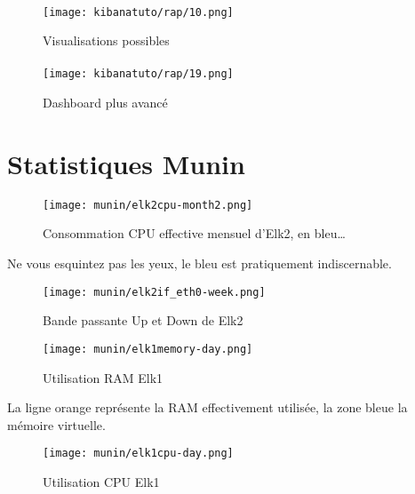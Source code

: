 \paragraph{}
\begin{figure}[H]
\center
\texttt{[image: kibanatuto/rap/10.png]}
\label{fig:kibanatuto7}
\caption{Visualisations possibles}
\end{figure}
\paragraph{}
\begin{figure}[H]
\center
\texttt{[image: kibanatuto/rap/19.png]}
\label{fig:kibanatuto12}
\caption{Dashboard plus avancé}
\end{figure}

\section{Statistiques Munin}
\begin{figure}[H]
\center
\texttt{[image: munin/elk2cpu-month2.png]}
\label{fig:elk2cpu}
\caption{Consommation CPU effective mensuel d'Elk2, en bleu\ldots}
\end{figure}
Ne vous esquintez pas les yeux, le bleu est pratiquement indiscernable.

\begin{figure}[H]
\center
\texttt{[image: munin/elk2if\_eth0-week.png]}
\label{fig:elk2eth0}
\caption{Bande passante Up et Down de Elk2}
\end{figure}
\begin{figure}[H]
\center
\texttt{[image: munin/elk1memory-day.png]}
\label{fig:elk1memory}
\caption{Utilisation RAM Elk1}
\end{figure}
La ligne orange représente la RAM effectivement utilisée, la zone bleue la mémoire virtuelle.
\begin{figure}[H]
\center
\texttt{[image: munin/elk1cpu-day.png]}
\label{fig:elk1cpu}
\caption{Utilisation CPU Elk1}
\end{figure}
